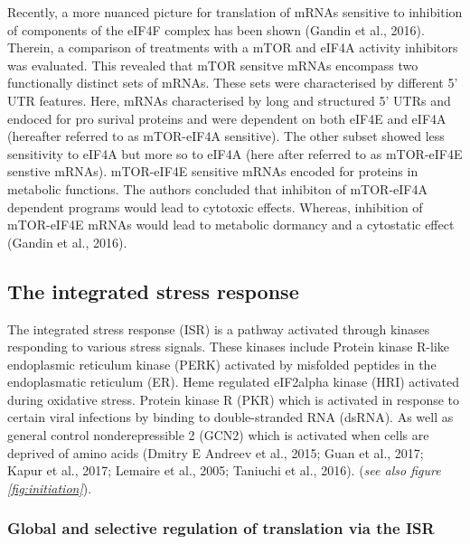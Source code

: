 \documentclass[12pt,openany]{book}
\begin{document}
Recently, a more nuanced picture for translation of mRNAs sensitive to
inhibition of components of the eIF4F complex has been shown (Gandin et
al., 2016). Therein, a comparison of treatments with a mTOR and eIF4A
activity inhibitors was evaluated. This revealed that mTOR sensitve
mRNAs encompass two functionally distinct sets of mRNAs. These sets were
characterised by different 5' UTR features. Here, mRNAs characterised by
long and structured 5' UTRs and endoced for pro surival proteins and
were dependent on both eIF4E and eIF4A (hereafter referred to as
mTOR-eIF4A sensitive). The other subset showed less sensitivity to eIF4A
but more so to eIF4A (here after referred to as mTOR-eIF4E senstive
mRNAs). mTOR-eIF4E sensitive mRNAs encoded for proteins in metabolic
functions. The authors concluded that inhibiton of mTOR-eIF4A dependent
programs would lead to cytotoxic effects. Whereas, inhibition of
mTOR-eIF4E mRNAs would lead to metabolic dormancy and a cytostatic
effect (Gandin et al., 2016).

\subsection{The integrated stress response}

The integrated stress response (ISR) is a pathway activated through
kinases responding to various stress signals. These kinases include
Protein kinase R-like endoplasmic reticulum kinase (PERK) activated by
misfolded peptides in the endoplasmatic reticulum (ER). Heme regulated
eIF2alpha kinase (HRI) activated during oxidative stress. Protein kinase
R (PKR) which is activated in response to certain viral infections by
binding to double-stranded RNA (dsRNA). As well as general control
nonderepressible 2 (GCN2) which is activated when cells are deprived of
amino acids (Dmitry E Andreev et al., 2015; Guan et al., 2017; Kapur et
al., 2017; Lemaire et al., 2005; Taniuchi et al., 2016). (\emph{see also
figure \ref{fig:initiation}}).

\subsubsection{Global and selective regulation of translation via the ISR}
\end{document}
